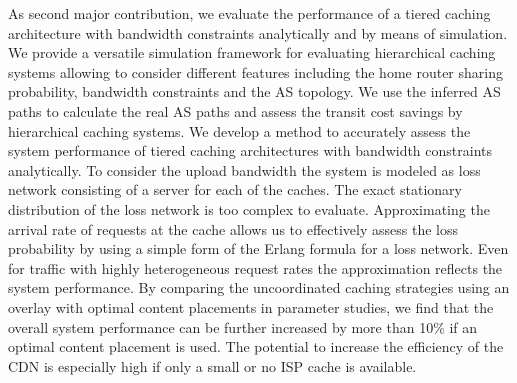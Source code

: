 As second major contribution, we evaluate the performance of a tiered caching architecture with bandwidth constraints analytically and by means of simulation.
We provide a versatile simulation framework for evaluating hierarchical caching systems allowing to consider different features including the home router sharing probability, bandwidth constraints and the AS topology.
We use the inferred AS paths to calculate the real AS paths and assess the transit cost savings by hierarchical caching systems.
We develop a method to accurately assess the system performance of tiered caching architectures with bandwidth constraints analytically.
To consider the upload bandwidth the system is modeled as loss network consisting of a server for each of the caches.
The exact stationary distribution of the loss network is too complex to evaluate.
Approximating the arrival rate of requests at the cache allows us to effectively assess the loss probability by using a simple form of the Erlang formula for a loss network.
Even for traffic with highly heterogeneous request rates the approximation reflects the system performance.
By comparing the uncoordinated caching strategies using an overlay with optimal content placements in parameter studies, we find that the overall system performance can be further increased by more than 10\% if an optimal content placement is used.
The potential to increase the efficiency of the CDN is especially high if only a small or no ISP cache is available.

